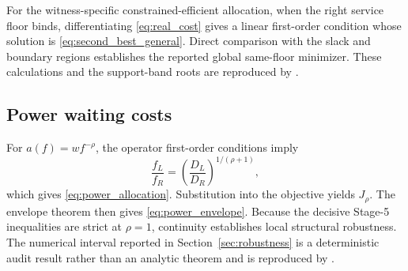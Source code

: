 For the witness-specific constrained-efficient allocation, when the right service floor binds, differentiating \eqref{eq:real_cost} gives a linear first-order condition whose solution is \eqref{eq:second_best_general}. Direct comparison with the slack and boundary regions establishes the reported global same-floor minimizer. These calculations and the support-band roots are reproduced by .

\subsection{Power waiting costs}

For $a(f)=wf^{-\rho}$, the operator first-order conditions imply
\begin{equation}
\frac{f_L}{f_R}=\left(\frac{D_L}{D_R}\right)^{1/(\rho+1)},
\end{equation}
which gives \eqref{eq:power_allocation}. Substitution into the objective yields $J_\rho$. The envelope theorem then gives \eqref{eq:power_envelope}. Because the decisive Stage-5 inequalities are strict at $\rho=1$, continuity establishes local structural robustness. The numerical interval reported in Section~\ref{sec:robustness} is a deterministic audit result rather than an analytic theorem and is reproduced by .
